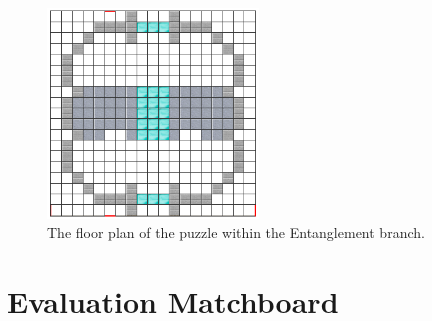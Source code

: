 \documentclass[11pt,twoside]{report} %
\newcommand*\Hidechapter{%
\titleformat{\section}[display]
  {}{}{0pt}{\Huge}
}
\begin{document}
\begin{figure}[h!]
\centering
\includegraphics[width=0.5\textwidth]{ent-puzzle}
\caption{The floor plan of the puzzle within the Entanglement branch.}
\label{fig:ent-puzzle}
\end{figure}

{
\Hidechapter
\chapter{Evaluation Matchboard}
\label{app:evamatchboard}
}
\end{document}
